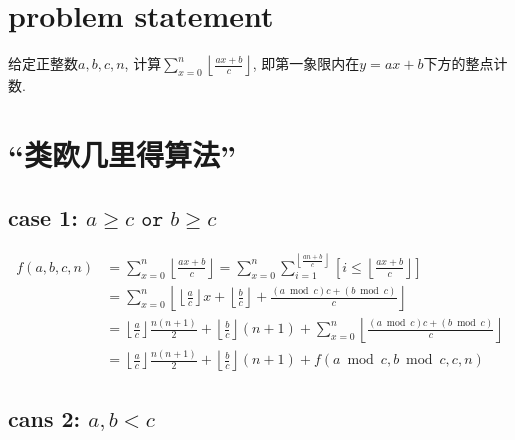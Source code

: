 \documentclass{article}
\begin{document}
\section{problem statement}

给定正整数$a,b,c,n$,
计算$\sum_{x=0}^n \left\lfloor\frac{ax+b}{c}\right\rfloor$,
即第一象限内在$y=ax+b$下方的整点计数.

\section{``类欧几里得算法''}

\subsection*{case 1: $a\geq c \texttt{ or } b\geq c$}

\[
	\begin{aligned}
		f(a,b,c,n)
			&=\sum_{x=0}^n \left\lfloor\frac{ax+b}{c}\right\rfloor
			 =\sum_{x=0}^n \sum_{i=1}^{\left\lfloor\frac{an+b}{c}\right\rfloor}
			 	\left[ i \leq \left\lfloor\frac{ax+b}{c}\right\rfloor \right]\\
			&=\sum_{x=0}^n
				\left\lfloor
					\left\lfloor\frac{a}{c}\right\rfloor x + \left\lfloor\frac{b}{c}\right\rfloor +
					\frac{(a\bmod c)c+(b\bmod c)}{c}
				\right\rfloor\\
			&=\left\lfloor\frac{a}{c}\right\rfloor\frac{n(n+1)}{2} + \left\lfloor\frac{b}{c}\right\rfloor(n+1) +
				\sum_{x=0}^n
					\left\lfloor
						\frac{(a\bmod c)c+(b\bmod c)}{c}
					\right\rfloor\\
			&=\left\lfloor\frac{a}{c}\right\rfloor\frac{n(n+1)}{2} + \left\lfloor\frac{b}{c}\right\rfloor(n+1)
				+ f(a\bmod c,b\bmod c,c,n)
	\end{aligned}
\]


\subsection*{cans 2: $a,b < c$}
\end{document}
